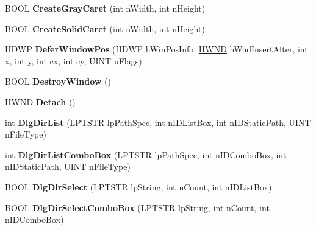 \begin{DoxyCompactItemize}
\item 
\mbox{\label{class_a_t_l_1_1_c_window_ab215effaefeee659ca7cd956e12b99aa}} 
B\+O\+OL {\bfseries Create\+Gray\+Caret} (int n\+Width, int n\+Height)
\item 
\mbox{\label{class_a_t_l_1_1_c_window_aa536d73832e6528f4ae0ddfd60bf8a19}} 
B\+O\+OL {\bfseries Create\+Solid\+Caret} (int n\+Width, int n\+Height)
\item 
\mbox{\label{class_a_t_l_1_1_c_window_a73ae55a0fa65580d8900e46930593c66}} 
H\+D\+WP {\bfseries Defer\+Window\+Pos} (H\+D\+WP h\+Win\+Pos\+Info, \hyperlink{interfacevoid}{H\+W\+ND} h\+Wnd\+Insert\+After, int x, int y, int cx, int cy, U\+I\+NT u\+Flags)
\item 
\mbox{\label{class_a_t_l_1_1_c_window_a4f6430fb88cd2e234f1cb9e28b3eec93}} 
B\+O\+OL {\bfseries Destroy\+Window} ()
\item 
\mbox{\label{class_a_t_l_1_1_c_window_a7bcc773777dd64950972951fbda8f201}} 
\hyperlink{interfacevoid}{H\+W\+ND} {\bfseries Detach} ()
\item 
\mbox{\label{class_a_t_l_1_1_c_window_a397f60b3e6512870023fe24a11e33b1e}} 
int {\bfseries Dlg\+Dir\+List} (L\+P\+T\+S\+TR lp\+Path\+Spec, int n\+I\+D\+List\+Box, int n\+I\+D\+Static\+Path, U\+I\+NT n\+File\+Type)
\item 
\mbox{\label{class_a_t_l_1_1_c_window_a331f8922b740f6fcad7fdc53c822c376}} 
int {\bfseries Dlg\+Dir\+List\+Combo\+Box} (L\+P\+T\+S\+TR lp\+Path\+Spec, int n\+I\+D\+Combo\+Box, int n\+I\+D\+Static\+Path, U\+I\+NT n\+File\+Type)
\item 
\mbox{\label{class_a_t_l_1_1_c_window_a11f10d8dd96a24c9778ec401976c897e}} 
B\+O\+OL {\bfseries Dlg\+Dir\+Select} (L\+P\+T\+S\+TR lp\+String, int n\+Count, int n\+I\+D\+List\+Box)
\item 
\mbox{\label{class_a_t_l_1_1_c_window_a5fdd32580842c0286dc3c6d522c2e7ed}} 
B\+O\+OL {\bfseries Dlg\+Dir\+Select\+Combo\+Box} (L\+P\+T\+S\+TR lp\+String, int n\+Count, int n\+I\+D\+Combo\+Box)

\end{DoxyCompactItemize}
